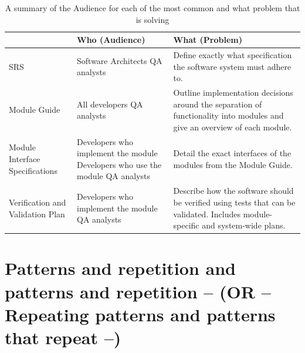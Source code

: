 \begin{table}[h]
\caption{A summary of the Audience for each of the most common \sfs{} and what 
problem that \sf{} is solving}
\label{tab:sfsummary}
\begin{tabular}{| P{.3\linewidth} | p{.3\linewidth}  | p{.3\linewidth} |}
\hline
 \SF{} & Who (Audience) & What (Problem)
\\ \hline
	SRS & 

	Software Architects \newline \newline
	QA analysts & 

	Define exactly what specification the software system must adhere to. 
\\ \hline
	Module Guide & 

	All developers \newline \newline
	QA analysts  & 

	Outline implementation decisions around the separation of functionality 
	into modules and give an overview of each module.
\\ \hline
	Module Interface Specifications & 

	Developers who implement the module \newline \newline
	Developers who use the module \newline \newline
	QA analysts & 

	Detail the exact interfaces of the modules from the Module Guide.
\\ \hline
	Verification and Validation Plan &
	
	Developers who implement the module \newline \newline
	QA analysts &

	Describe how the software should be verified using tests that can be 
	validated. Includes module-specific and system-wide plans.
\\ \hline
\end{tabular}
\end{table}

\section{Patterns and repetition and patterns and repetition -- (OR -- 
Repeating patterns and patterns that repeat --)}
\label{sec:patterns}

